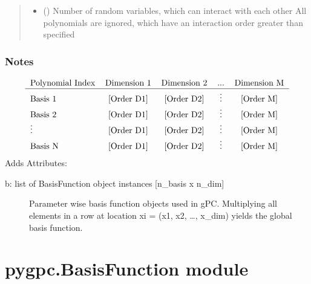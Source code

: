 \documentclass[letterpaper,10pt,english,openany,oneside]{sphinxmanual}
\begin{document}
\begin{fulllineitems}
\begin{fulllineitems}
\begin{quote}
\begin{description}
\begin{itemize}
\item {} 
 () \textendash{} Number of random variables, which can interact with each other
All polynomials are ignored, which have an interaction order greater than specified

\end{itemize}

\end{description}\end{quote}
\subsubsection*{Notes}
\begin{equation*}
\begin{split}\begin{tabular}{l*{4}{c}}
 Polynomial Index    & Dimension 1 & Dimension 2 & ... & Dimension M \\
\hline
 Basis 1             & [Order D1] & [Order D2] & \vdots & [Order M] \\
 Basis 2             & [Order D1] & [Order D2] & \vdots & [Order M] \\
\vdots              & [Order D1] & [Order D2] & \vdots  & [Order M] \\
 Basis N           & [Order D1] & [Order D2] & \vdots & [Order M] \\
\end{tabular}\end{split}
\end{equation*}
Adds Attributes:
\begin{description}
\item[{b: list of BasisFunction object instances {[}n\_basis x n\_dim{]}}] \leavevmode
Parameter wise basis function objects used in gPC.
Multiplying all elements in a row at location xi = (x1, x2, …, x\_dim) yields the global basis function.

\end{description}

\end{fulllineitems}


\end{fulllineitems}



\section{pygpc.BasisFunction module}
\label{\detokenize{pygpc:module-pygpc.BasisFunction}}\label{\detokenize{pygpc:pygpc-basisfunction-module}}
\end{document}
